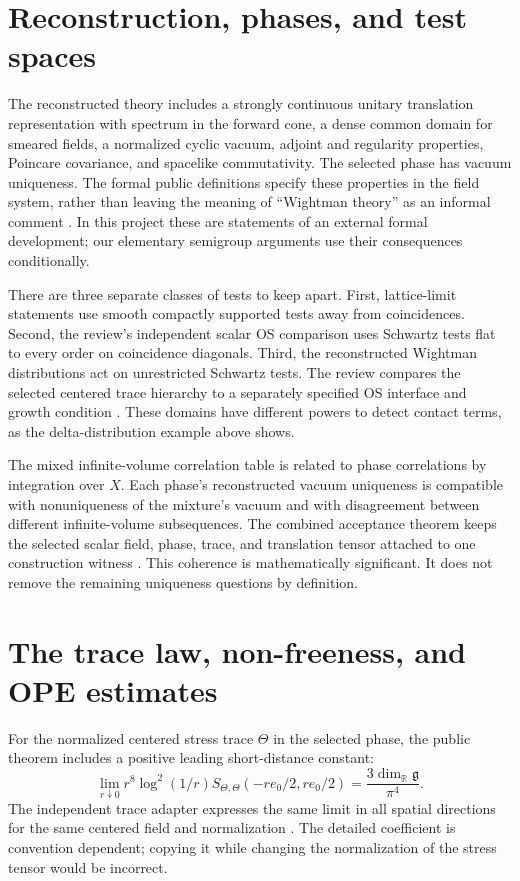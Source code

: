 \section{Reconstruction, phases, and test spaces}

The reconstructed theory includes a strongly continuous unitary
translation representation with spectrum in the forward cone, a dense
common domain for smeared fields, a normalized cyclic vacuum, adjoint and
regularity properties, Poincare covariance, and spacelike commutativity.
The selected phase has vacuum uniqueness.  The formal public definitions
specify these properties in the field system, rather than leaving the
meaning of ``Wightman theory'' as an informal comment
\cite{OpenAITheory2026}.  In this project these are statements of an
external formal development; our elementary semigroup arguments use their
consequences conditionally.

There are three separate classes of tests to keep apart.  First,
lattice-limit statements use smooth compactly supported tests away from
coincidences.  Second, the review's independent scalar OS comparison uses
Schwartz tests flat to every order on coincidence diagonals.  Third, the
reconstructed Wightman distributions act on unrestricted Schwartz tests.
The review compares the selected centered trace hierarchy to a separately
specified OS interface and growth condition
\cite{YMScalarOS2026}.  These domains have different powers to detect
contact terms, as the delta-distribution example above shows.

The mixed infinite-volume correlation table is related to phase
correlations by integration over $X$.  Each phase's reconstructed vacuum
uniqueness is compatible with nonuniqueness of the mixture's vacuum and
with disagreement between different infinite-volume subsequences.  The
combined acceptance theorem keeps the selected scalar field, phase, trace,
and translation tensor attached to one construction witness
\cite{YMCombined2026}.  This coherence is mathematically significant.
It does not remove the remaining uniqueness questions by definition.

\section{The trace law, non-freeness, and OPE estimates}

For the normalized centered stress trace $\Theta$ in the selected phase,
the public theorem includes a positive leading short-distance constant:
\begin{equation}
 \lim_{r\downarrow0}
 r^8\log^2(1/r)
 S_{\Theta,\Theta}(-re_0/2,re_0/2)
 =\frac{3\dim_{\mathbb R}\mathfrak g}{\pi^4}.
 \label{eq:openai-trace}
\end{equation}
The independent trace adapter expresses the same limit in all spatial
directions for the same centered field and normalization
\cite{YMLeadingTrace2026}.  The detailed coefficient is convention
dependent; copying it while changing the normalization of the stress
tensor would be incorrect.


